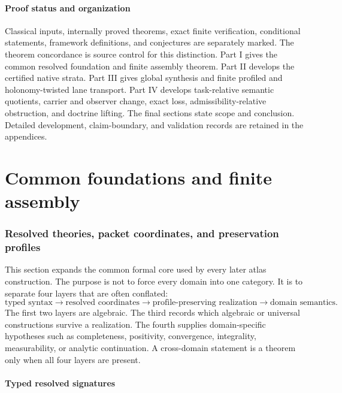 \documentclass[11pt]{article}
\theoremstyle{definition}
\theoremstyle{remark}
\begin{document}
\subsection{Proof status and organization}

Classical inputs, internally proved theorems, exact finite verification, conditional statements, framework definitions, and conjectures are separately marked. The theorem concordance is source control for this distinction. Part I gives the common resolved foundation and finite assembly theorem. Part II develops the certified native strata. Part III gives global synthesis and finite profiled and holonomy-twisted lane transport. Part IV develops task-relative semantic quotients, carrier and observer change, exact loss, admissibility-relative obstruction, and doctrine lifting. The final sections state scope and conclusion. Detailed development, claim-boundary, and validation records are retained in the appendices.



\part{Common foundations and finite assembly}
\section{Resolved theories, packet coordinates, and preservation profiles}
\label{sec:resolved-foundations}

This section expands the common formal core used by every later atlas construction.  The purpose is not to force every domain into one category.  It is to separate four layers that are often conflated:
\[
\boxed{
\text{typed syntax}
\longrightarrow
\text{resolved coordinates}
\longrightarrow
\text{profile-preserving realization}
\longrightarrow
\text{domain semantics}.}
\]
The first two layers are algebraic.  The third records which algebraic or universal constructions survive a realization.  The fourth supplies domain-specific hypotheses such as completeness, positivity, convergence, integrality, measurability, or analytic continuation.  A cross-domain statement is a theorem only when all four layers are present.

\subsection{Typed resolved signatures}
\label{subsec:typed-resolved-signatures}
\end{document}
